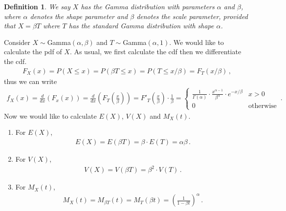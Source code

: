 \documentclass[11pt,oneside]{book}
\theoremstyle{newStyle}
\newtheorem{defn}[thm]{Definition}
\begin{document}
\begin{defn}
We say $X$ has the Gamma distribution with parameters $\alpha$ and $\beta$, where $\alpha$ denotes the shape parameter and $\beta$ denotes the scale parameter, provided that $X = \beta T$ where $T$ has the standard Gamma distribution with shape $\alpha$. 
\end{defn}
Consider $X\sim$Gamma$(\alpha, \beta)$ and $T\sim$Gamma$(\alpha, 1)$. We would like to calculate the pdf of $X$. As usual, we first calculate the cdf then we differentiate the cdf. 
\begin{align*}
F_X(x) = P(X\leq x) = P(\beta T\leq x) = P(T\leq x/\beta) = F_T(x/\beta)\,,
\end{align*}
thus we can write
\begin{align*}
f_X(x) = \frac{d}{dx}(F_x(x)) = \frac{d}{dx}\left( F_T\left( \frac{x}{\beta}\right)\right) = F'_T\left( \frac{x}{\beta}\right) \cdot\frac{1}{\beta} = \begin{cases}
\frac{1}{\Gamma(\alpha)}\cdot 
\frac{x^{\alpha-1}}{\beta^\alpha}
 \cdot e^{-x/\beta} & x >0 \\
0 & \text{otherwise}
\end{cases}\,.
\end{align*}
Now we would like to calculate $E(X)$, $V(X)$ and $M_X(t)$. 
\begin{enumerate}
\item For $E(X)$,
\begin{align*}
E(X) = E(\beta T) = \beta\cdot E(T) = \alpha\beta\,.
\end{align*}
\item For $V(X)$,
\begin{align*}
V(X) =  V(\beta T)  = \beta^2\cdot V(T)\,.
\end{align*}
\item For $M_X(t)$, 
\begin{align*}
M_X(t) = M_{\beta T}(t) = M_T(\beta t) = \left( \frac{1}{1-\beta t}\right)^\alpha\,.\\
\end{align*}
\end{enumerate}
\end{document}
